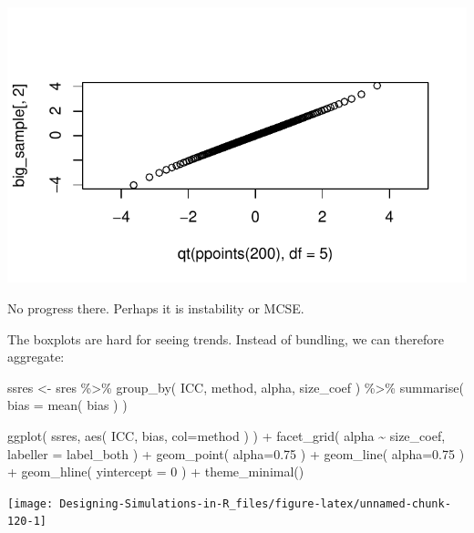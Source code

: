 \documentclass[
]{book}
\newenvironment{Shaded}{\begin{snugshade}}{\end{snugshade}}
\newcommand{\AttributeTok}[1]{\textcolor[rgb]{0.77,0.63,0.00}{#1}}
\newcommand{\DecValTok}[1]{\textcolor[rgb]{0.00,0.00,0.81}{#1}}
\newcommand{\FloatTok}[1]{\textcolor[rgb]{0.00,0.00,0.81}{#1}}
\newcommand{\FunctionTok}[1]{\textcolor[rgb]{0.00,0.00,0.00}{#1}}
\newcommand{\NormalTok}[1]{#1}
\newcommand{\OtherTok}[1]{\textcolor[rgb]{0.56,0.35,0.01}{#1}}
\newcommand{\SpecialCharTok}[1]{\textcolor[rgb]{0.00,0.00,0.00}{#1}}
\begin{document}
\begin{center}\includegraphics[width=0.75\linewidth]{Designing-Simulations-in-R_files/figure-latex/unnamed-chunk-119-1} \end{center}

No progress there. Perhaps it is instability or MCSE.

The boxplots are hard for seeing trends.
Instead of bundling, we can therefore aggregate:

\begin{Shaded}
\begin{Highlighting}[]
\NormalTok{ssres }\OtherTok{\textless{}{-}} 
\NormalTok{  sres }\SpecialCharTok{\%\textgreater{}\%} 
  \FunctionTok{group\_by}\NormalTok{( ICC, method, alpha, size\_coef ) }\SpecialCharTok{\%\textgreater{}\%}
  \FunctionTok{summarise}\NormalTok{( }\AttributeTok{bias =} \FunctionTok{mean}\NormalTok{( bias ) )}

\FunctionTok{ggplot}\NormalTok{( ssres, }\FunctionTok{aes}\NormalTok{( ICC, bias, }\AttributeTok{col=}\NormalTok{method ) ) }\SpecialCharTok{+}
  \FunctionTok{facet\_grid}\NormalTok{( alpha }\SpecialCharTok{\textasciitilde{}}\NormalTok{  size\_coef, }\AttributeTok{labeller =}\NormalTok{ label\_both ) }\SpecialCharTok{+}
  \FunctionTok{geom\_point}\NormalTok{( }\AttributeTok{alpha=}\FloatTok{0.75}\NormalTok{ ) }\SpecialCharTok{+} 
  \FunctionTok{geom\_line}\NormalTok{( }\AttributeTok{alpha=}\FloatTok{0.75}\NormalTok{ ) }\SpecialCharTok{+}
  \FunctionTok{geom\_hline}\NormalTok{( }\AttributeTok{yintercept =} \DecValTok{0}\NormalTok{ ) }\SpecialCharTok{+}
  \FunctionTok{theme\_minimal}\NormalTok{()}
\end{Highlighting}
\end{Shaded}

\begin{center}\texttt{[image: Designing-Simulations-in-R\_files/figure-latex/unnamed-chunk-120-1]} \end{center}
\end{document}
